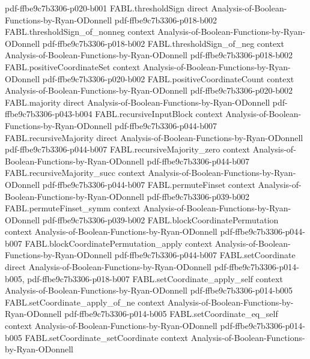 \begin{theorem}
  {pdf-ffbe9c7b3306-p020-b001}
\proofstep
  {FABL.thresholdSign}
  {direct}
  {Analysis-of-Boolean-Functions-by-Ryan-ODonnell}
  {pdf-ffbe9c7b3306-p018-b002}
\proofstep
  {FABL.thresholdSign_of_nonneg}
  {context}
  {Analysis-of-Boolean-Functions-by-Ryan-ODonnell}
  {pdf-ffbe9c7b3306-p018-b002}
\proofstep
  {FABL.thresholdSign_of_neg}
  {context}
  {Analysis-of-Boolean-Functions-by-Ryan-ODonnell}
  {pdf-ffbe9c7b3306-p018-b002}
\proofstep
  {FABL.positiveCoordinateSet}
  {context}
  {Analysis-of-Boolean-Functions-by-Ryan-ODonnell}
  {pdf-ffbe9c7b3306-p020-b002}
\proofstep
  {FABL.positiveCoordinateCount}
  {context}
  {Analysis-of-Boolean-Functions-by-Ryan-ODonnell}
  {pdf-ffbe9c7b3306-p020-b002}
\proofstep
  {FABL.majority}
  {direct}
  {Analysis-of-Boolean-Functions-by-Ryan-ODonnell}
  {pdf-ffbe9c7b3306-p043-b004}
\proofstep
  {FABL.recursiveInputBlock}
  {context}
  {Analysis-of-Boolean-Functions-by-Ryan-ODonnell}
  {pdf-ffbe9c7b3306-p044-b007}
\proofstep
  {FABL.recursiveMajority}
  {direct}
  {Analysis-of-Boolean-Functions-by-Ryan-ODonnell}
  {pdf-ffbe9c7b3306-p044-b007}
\proofstep
  {FABL.recursiveMajority_zero}
  {context}
  {Analysis-of-Boolean-Functions-by-Ryan-ODonnell}
  {pdf-ffbe9c7b3306-p044-b007}
\proofstep
  {FABL.recursiveMajority_succ}
  {context}
  {Analysis-of-Boolean-Functions-by-Ryan-ODonnell}
  {pdf-ffbe9c7b3306-p044-b007}
\proofstep
  {FABL.permuteFinset}
  {context}
  {Analysis-of-Boolean-Functions-by-Ryan-ODonnell}
  {pdf-ffbe9c7b3306-p039-b002}
\proofstep
  {FABL.permuteFinset_symm}
  {context}
  {Analysis-of-Boolean-Functions-by-Ryan-ODonnell}
  {pdf-ffbe9c7b3306-p039-b002}
\proofstep
  {FABL.blockCoordinatePermutation}
  {context}
  {Analysis-of-Boolean-Functions-by-Ryan-ODonnell}
  {pdf-ffbe9c7b3306-p044-b007}
\proofstep
  {FABL.blockCoordinatePermutation_apply}
  {context}
  {Analysis-of-Boolean-Functions-by-Ryan-ODonnell}
  {pdf-ffbe9c7b3306-p044-b007}
\proofstep
  {FABL.setCoordinate}
  {direct}
  {Analysis-of-Boolean-Functions-by-Ryan-ODonnell}
  {pdf-ffbe9c7b3306-p014-b005,
    pdf-ffbe9c7b3306-p018-b007}
\proofstep
  {FABL.setCoordinate_apply_self}
  {context}
  {Analysis-of-Boolean-Functions-by-Ryan-ODonnell}
  {pdf-ffbe9c7b3306-p014-b005}
\proofstep
  {FABL.setCoordinate_apply_of_ne}
  {context}
  {Analysis-of-Boolean-Functions-by-Ryan-ODonnell}
  {pdf-ffbe9c7b3306-p014-b005}
\proofstep
  {FABL.setCoordinate_eq_self}
  {context}
  {Analysis-of-Boolean-Functions-by-Ryan-ODonnell}
  {pdf-ffbe9c7b3306-p014-b005}
\proofstep
  {FABL.setCoordinate_setCoordinate}
  {context}
  {Analysis-of-Boolean-Functions-by-Ryan-ODonnell}

\end{theorem}
